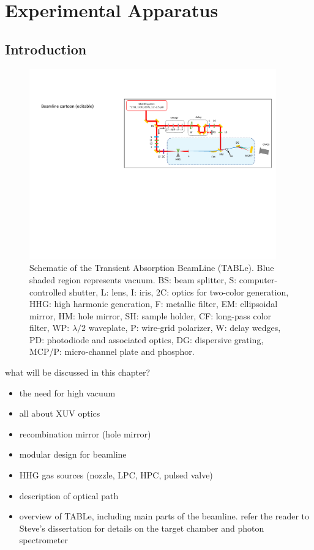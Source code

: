 \chapter{Experimental Apparatus}

\section{Introduction}

\begin{figure}
	\centering
	\includegraphics[width=0.95\textwidth]{figures/chap2/beamline_schematic.pdf}
	\caption{Schematic of the Transient Absorption BeamLine (TABLe). Blue shaded region represents vacuum. BS: beam splitter, S: computer-controlled shutter, L: lens, I: iris, 2C: optics for two-color generation, HHG: high harmonic generation, F: metallic filter, EM: ellipsoidal mirror, HM: hole mirror, SH: sample holder, CF: long-pass color filter, WP: $\lambda/2$ waveplate, P: wire-grid polarizer, W: delay wedges, PD: photodiode and associated optics, DG: dispersive grating, MCP/P: micro-channel plate and phosphor.}
	\label{fig:beamline_schematic}
\end{figure}


what will be discussed in this chapter?
\begin{itemize}
	\item the need for high vacuum
	\item all about XUV optics
	\item recombination mirror (hole mirror)
	\item modular design for beamline
	\item HHG gas sources (nozzle, LPC, HPC, pulsed valve)
	\item description of optical path
	\item overview of TABLe, including main parts of the beamline. refer the reader to Steve's dissertation \cite{hagemanComplexAttosecondTransientAbsorption2020} for details on the target chamber and photon spectrometer
\end{itemize}



